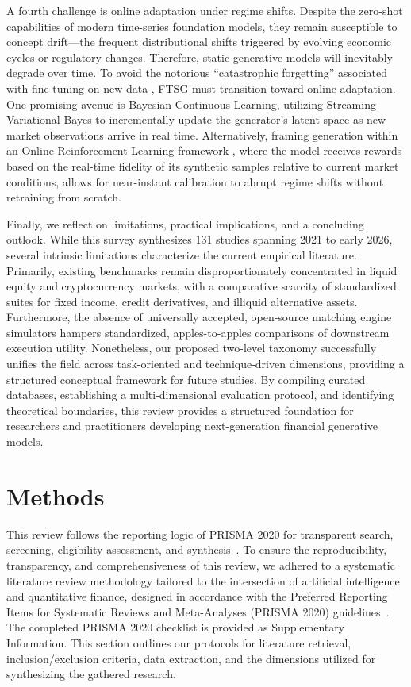\documentclass[11pt,a4paper]{article}
\begin{document}
A fourth challenge is online adaptation under regime shifts. Despite the zero-shot capabilities of modern time-series foundation models, they remain susceptible to concept drift---the frequent distributional shifts triggered by evolving economic cycles or regulatory changes. Therefore, static generative models will inevitably degrade over time. To avoid the notorious ``catastrophic forgetting'' associated with fine-tuning on new data \cite{mccloskey1989catastrophic, zenke2017continual}, FTSG must transition toward online adaptation.
One promising avenue is Bayesian Continuous Learning, utilizing Streaming Variational Bayes \cite{nguyen2017variational} to incrementally update the generator's latent space as new market observations arrive in real time. Alternatively, framing generation within an Online Reinforcement Learning framework \cite{moody2001learning}, where the model receives rewards based on the real-time fidelity of its synthetic samples relative to current market conditions, allows for near-instant calibration to abrupt regime shifts without retraining from scratch.

Finally, we reflect on limitations, practical implications, and a concluding outlook. While this survey synthesizes 131 studies spanning 2021 to early 2026, several intrinsic limitations characterize the current empirical literature. Primarily, existing benchmarks remain disproportionately concentrated in liquid equity and cryptocurrency markets, with a comparative scarcity of standardized suites for fixed income, credit derivatives, and illiquid alternative assets. Furthermore, the absence of universally accepted, open-source matching engine simulators hampers standardized, apples-to-apples comparisons of downstream execution utility. 
Nonetheless, our proposed two-level taxonomy successfully unifies the field across task-oriented and technique-driven dimensions, providing a structured conceptual framework for future studies. By compiling curated databases, establishing a multi-dimensional evaluation protocol, and identifying theoretical boundaries, this review provides a structured foundation for researchers and practitioners developing next-generation financial generative models.

\section{Methods}
\label{sec:methods}

This review follows the reporting logic of PRISMA 2020 for transparent search, screening, eligibility assessment, and synthesis~\citep{page2021prisma}.
To ensure the reproducibility, transparency, and comprehensiveness of this review, we adhered to a systematic literature review methodology tailored to the intersection of artificial intelligence and quantitative finance, designed in accordance with the Preferred Reporting Items for Systematic Reviews and Meta-Analyses (PRISMA 2020) guidelines~\citep{page2021prisma}. The completed PRISMA 2020 checklist is provided as Supplementary Information. This section outlines our protocols for literature retrieval, inclusion/exclusion criteria, data extraction, and the dimensions utilized for synthesizing the gathered research.
\end{document}
